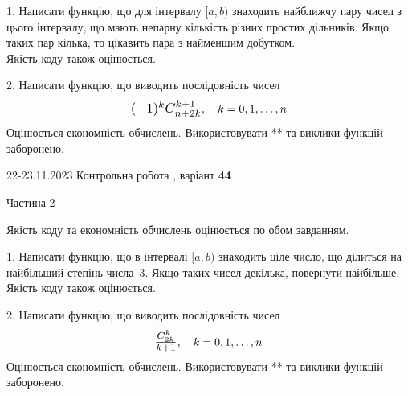 \documentclass[12pt, ukrainian]{article}
\begin{document}
{{{{{{{{{{{{{{{\begin {Large}
1. Написати функцію, що для інтервалу $[a, b)$ знаходить найближчу пару чисел з цього інтервалу, що мають непарну кількість різних простих дільників. Якщо таких пар кілька, то цікавить пара з найменшим добутком.\\	Якість коду також оцінюється. 



\vspace{10mm}



2. 
Написати функцію, що виводить послідовність чисел
$$\scalebox{1.2}{$(-1)^{k}C_{n+2k}^{k+1}$}, \quad k=0,1,\ldots,n$$
Оцінюється економність обчислень. Використовувати ** та виклики функцій заборонено.

\end{Large}\newpage




\begin {Huge}
{{22-23.11.2023 Контрольна робота , варіант  \No \textbf { 44 }\par}}

\begin{center}Частина 2
\end{center}
\vspace{10mm}
\end {Huge}

{
\begin {Large}
Якість коду та економність обчислень оцінюється по обом завданням.

\vspace{5mm}

1. Написати функцію, що в інтервалі $[a, b)$ знаходить ціле число, що ділиться на найбільший степінь числа 3. Якщо таких чисел декілька, повернути найбільше.\\	Якість коду також оцінюється. 



\vspace{10mm}



2. 
Написати функцію, що виводить послідовність чисел
$$\scalebox{1.2}{$\frac{C_{2k}^k}{k+1}$}, \quad k=0,1,\ldots,n$$
Оцінюється економність обчислень. Використовувати ** та виклики функцій заборонено.

\end{Large}\newpage




}}}}}}}}}}}}}}}}
\end{document}
